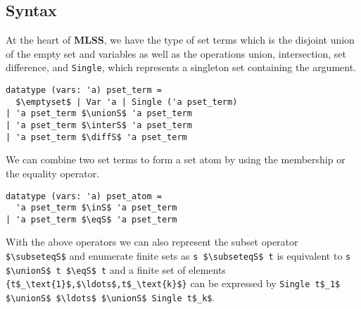 \documentclass[sigplan,10pt,anonymous,review]{acmart}
\newcommand{\MLSS}{\textbf{MLSS}}
\newcommand{\unionS}{\sqcup_\text{s}}
\newcommand{\interS}{\sqcap_\text{s}}
\newcommand{\diffS}{-_\text{s}}
\newcommand{\inS}{\in_\text{s}}
\newcommand{\eqS}{=_\text{s}}
\newcommand{\subseteqS}{\sqsubseteq_\text{s}}
\begin{document}
\subsection{Syntax}
At the heart of \MLSS{}, we have the type of set terms which is the disjoint union of the empty set and variables as well as the operations union, intersection, set difference, and \lstinline!Single!, which represents a singleton set containing the argument.
\begin{lstlisting}
datatype (vars: 'a) pset_term =
  $\emptyset$ | Var 'a | Single ('a pset_term)
| 'a pset_term $\unionS$ 'a pset_term
| 'a pset_term $\interS$ 'a pset_term
| 'a pset_term $\diffS$ 'a pset_term
\end{lstlisting}
We can combine two set terms to form a set atom by using the membership or the equality operator.
\begin{lstlisting}
datatype (vars: 'a) pset_atom =
  'a pset_term $\inS$ 'a pset_term
| 'a pset_term $\eqS$ 'a pset_term
\end{lstlisting}
With the above operators we can also represent the subset operator \lstinline!$\subseteqS$! and enumerate finite sets as \lstinline!s $\subseteqS$ t! is equivalent to \lstinline!s $\unionS$ t $\eqS$ t! and a finite set of elements \lstinline!{t$_\text{1}$,$\ldots$,t$_\text{k}$}! can be expressed by \lstinline!Single t$_1$ $\unionS$ $\ldots$ $\unionS$ Single t$_k$!.
\end{document}

